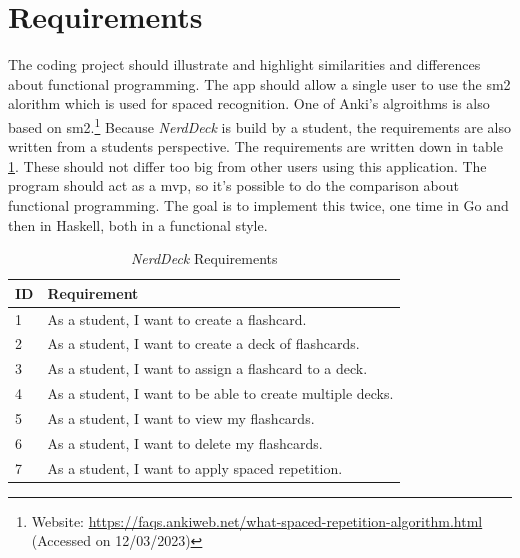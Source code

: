     \section{Requirements}
    The coding project should illustrate and highlight similarities and differences about functional programming. The \ac{app} should allow a single user to use the \ac{sm2} alorithm which is used for spaced recognition.\cite{sm2} One of Anki's algroithms is also based on \ac{sm2}.\footnote{Website: \url{https://faqs.ankiweb.net/what-spaced-repetition-algorithm.html} (Accessed on 12/03/2023)} Because \textit{NerdDeck} is build by a student, the requirements are also written from a students perspective. The requirements are written down in table \ref{tab:requirements}. These should not differ too big from other users using this application. The program should act as a \ac{mvp}, so it's possible to do the comparison about functional programming. The goal is to implement this twice, one time in Go and then in Haskell, both in a functional style.
    \begin{table}[h]
        \centering
        \begin{tabular}{|m{0.5in}|m{4in}|}
            \hline
            \textbf{ID} & \textbf{Requirement} \\
            \hline
            1 & As a student, I want to create a flashcard. \\
            \hline
            2 & As a student, I want to create a deck of flashcards. \\
            \hline
            3 & As a student, I want to assign a flashcard to a deck. \\
            \hline
            4 & As a student, I want to be able to create multiple decks. \\
            \hline
            5 & As a student, I want to view my flashcards. \\
            \hline
            6 & As a student, I want to delete my flashcards. \\
            \hline
            7 & As a student, I want to apply spaced repetition. \\
            \hline
        \end{tabular}
        \caption{\textit{NerdDeck} Requirements}
        \label{tab:requirements}
    \end{table}


